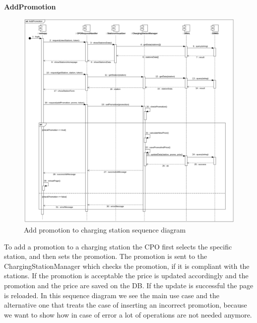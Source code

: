 \clearpage
\textbf{AddPromotion}\\
\begin{figure}[H]
    \centering
    \includegraphics[width=1\textwidth]{Images/cp2/runtime/AddPromotion.png}
    \caption{Add promotion to charging station sequence diagram}
\end{figure}
To add a promotion to a charging station the CPO first selects the specific station, and then sets the promotion. The promotion is sent to the ChargingStationManager which checks the promotion, if it is compliant with the stations. If the promotion is acceptable the price is updated accordingly and the promotion and the price are saved on the DB. If the update is successful the page is reloaded. In this sequence diagram we see the main use case and the alternative one that treats the case of inserting an incorrect promotion, because we want to show how in case of error a lot of operations are not needed anymore.

